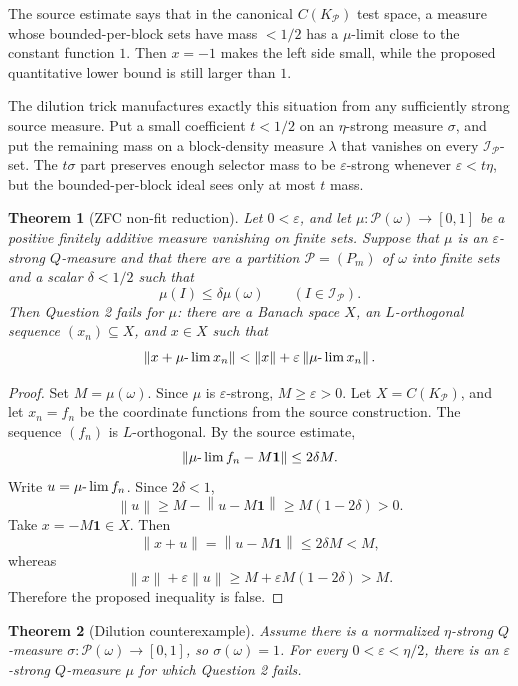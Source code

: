 \documentclass[11pt]{article}
\newtheorem{theorem}{Theorem}
\newcommand{\norm}[1]{\left\lVert #1\right\rVert}
\newcommand{\one}{\mathbf 1}
\begin{document}
The source estimate says that in the canonical \(C(K_{\mathcal P})\) test
space, a measure whose bounded-per-block sets have mass \(<1/2\) has a
\(\mu\)-limit close to the constant function \(1\).  Then \(x=-1\) makes the
left side small, while the proposed quantitative lower bound is still larger
than \(1\).

The dilution trick manufactures exactly this situation from any sufficiently
strong source measure.  Put a small coefficient \(t<1/2\) on an
\(\eta\)-strong measure \(\sigma\), and put the remaining mass on a
block-density measure \(\lambda\) that vanishes on every
\(\mathcal I_{\mathcal P}\)-set.  The \(t\sigma\) part preserves enough
selector mass to be \(\varepsilon\)-strong whenever \(\varepsilon<t\eta\), but
the bounded-per-block ideal sees only at most \(t\) mass.

\begin{theorem}[ZFC non-fit reduction]
Let \(0<\varepsilon\), and let \(\mu:\mathcal P(\omega)\to[0,1]\) be a
positive finitely additive measure vanishing on finite sets.  Suppose that
\(\mu\) is an \(\varepsilon\)-strong \(Q\)-measure and that there are a
partition \(\mathcal P=(P_m)\) of \(\omega\) into finite sets and a scalar
\(\delta<1/2\) such that
\[
  \mu(I)\le \delta\mu(\omega)\qquad(I\in\mathcal I_{\mathcal P}).
\]
Then Question 2 fails for \(\mu\): there are a Banach space \(X\), an
\(L\)-orthogonal sequence \((x_n)\subseteq X\), and \(x\in X\) such that
\[
  \norm{x+\mu\hbox{-}\lim x_n}<
  \norm{x}+\varepsilon\norm{\mu\hbox{-}\lim x_n}.
\]
\end{theorem}

\begin{proof}
Set \(M=\mu(\omega)\).  Since \(\mu\) is \(\varepsilon\)-strong, \(M\ge
\varepsilon>0\).  Let \(X=C(K_{\mathcal P})\), and let \(x_n=f_n\) be the
coordinate functions from the source construction.  The sequence \((f_n)\) is
\(L\)-orthogonal.  By the source estimate,
\[
  \norm{\mu\hbox{-}\lim f_n-M\one}\le 2\delta M.
\]
Write \(u=\mu\hbox{-}\lim f_n\).  Since \(2\delta<1\),
\[
  \norm{u}\ge M-\norm{u-M\one}\ge M(1-2\delta)>0.
\]
Take \(x=-M\one\in X\).  Then
\[
  \norm{x+u}=\norm{u-M\one}\le 2\delta M<M,
\]
whereas
\[
  \norm{x}+\varepsilon\norm{u}
  \ge M+\varepsilon M(1-2\delta)>M.
\]
Therefore the proposed inequality is false.
\end{proof}

\begin{theorem}[Dilution counterexample]
Assume there is a normalized \(\eta\)-strong \(Q\)-measure
\(\sigma:\mathcal P(\omega)\to[0,1]\), so \(\sigma(\omega)=1\).  For every
\(0<\varepsilon<\eta/2\), there is an \(\varepsilon\)-strong \(Q\)-measure
\(\mu\) for which Question 2 fails.
\end{theorem}
\end{document}
